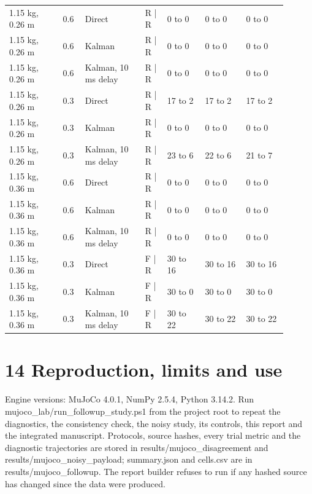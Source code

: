 \documentclass[11pt,a4paper]{article}
\begin{document}
\begin{longtable}{p{0.171\linewidth}p{0.072\linewidth}p{0.198\linewidth}p{0.072\linewidth}p{0.126\linewidth}p{0.131\linewidth}p{0.131\linewidth}}
1.15 kg, 0.26 m & 0.6 & Direct & R | R & 0 to 0 & 0 to 0 & 0 to 0 \\
1.15 kg, 0.26 m & 0.6 & Kalman & R | R & 0 to 0 & 0 to 0 & 0 to 0 \\
1.15 kg, 0.26 m & 0.6 & Kalman, 10 ms delay & R | R & 0 to 0 & 0 to 0 & 0 to 0 \\
1.15 kg, 0.26 m & 0.3 & Direct & R | R & 17 to 2 & 17 to 2 & 17 to 2 \\
1.15 kg, 0.26 m & 0.3 & Kalman & R | R & 0 to 0 & 0 to 0 & 0 to 0 \\
1.15 kg, 0.26 m & 0.3 & Kalman, 10 ms delay & R | R & 23 to 6 & 22 to 6 & 21 to 7 \\
1.15 kg, 0.36 m & 0.6 & Direct & R | R & 0 to 0 & 0 to 0 & 0 to 0 \\
1.15 kg, 0.36 m & 0.6 & Kalman & R | R & 0 to 0 & 0 to 0 & 0 to 0 \\
1.15 kg, 0.36 m & 0.6 & Kalman, 10 ms delay & R | R & 0 to 0 & 0 to 0 & 0 to 0 \\
1.15 kg, 0.36 m & 0.3 & Direct & F | R & 30 to 16 & 30 to 16 & 30 to 16 \\
1.15 kg, 0.36 m & 0.3 & Kalman & F | R & 30 to 0 & 30 to 0 & 30 to 0 \\
1.15 kg, 0.36 m & 0.3 & Kalman, 10 ms delay & F | R & 30 to 22 & 30 to 22 & 30 to 22 \\
\bottomrule
\end{longtable}
\clearpage
\section*{14 Reproduction, limits and use}
Engine versions: MuJoCo 4.0.1, NumPy 2.5.4, Python 3.14.2. Run mujoco\_lab/run\_followup\_study.ps1 from the project root to repeat the diagnostics, the consistency check, the noisy study, its controls, this report and the integrated manuscript. Protocols, source hashes, every trial metric and the diagnostic trajectories are stored in results/mujoco\_disagreement and results/mujoco\_noisy\_payload; summary.json and cells.csv are in results/mujoco\_followup. The report builder refuses to run if any hashed source has changed since the data were produced.
\end{document}
